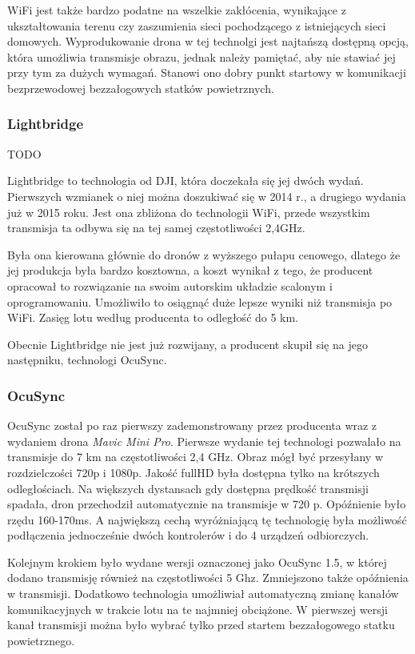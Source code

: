 WiFi jest także bardzo podatne na wszelkie zakłócenia, wynikające z ukształtowania terenu czy zaszumienia sieci pochodzącego z istniejących sieci domowych. Wyprodukowanie drona w tej technolgi jest najtańszą dostępną opcją, która umożliwia transmisje obrazu, jednak należy pamiętać, aby nie stawiać jej przy tym za dużych wymagań. Stanowi ono dobry punkt startowy w komunikacji bezprzewodowej bezzałogowych statków powietrznych.

\subsubsection{Lightbridge} TODO

Lightbridge to technologia od DJI, która doczekała się jej dwóch wydań. Pierwszych wzmianek o niej można doszukiwać się w 2014 r., a drugiego wydania już w 2015 roku. Jest ona zbliżona do technologii WiFi, przede wszystkim transmisja ta odbywa się na tej samej częstotliwości 2,4GHz.


Była ona kierowana głównie do dronów z wyższego pułapu cenowego, dlatego że jej produkcja była bardzo kosztowna, a koszt wynikał z tego, że producent opracował to rozwiązanie na swoim autorskim układzie scalonym i oprogramowaniu. Umożliwiło to osiągnąć duże lepsze wyniki niż transmisja po WiFi. Zasięg lotu według producenta to odległość do 5 km.


Obecnie Lightbridge nie jest już rozwijany, a producent skupił się na jego następniku, technologi OcuSync. \cite{lightbridge-dji}\cite{lightbridge2-dji}

\subsubsection{OcuSync} 
OcuSync został po raz pierwszy zademonstrowany przez producenta wraz z wydaniem drona \emph{Mavic Mini Pro}. Pierwsze wydanie tej technologi pozwalało na transmisje do 7 km na częstotliwości 2,4 GHz. Obraz mógł być przesyłany w rozdzielczości 720p i 1080p. Jakość fullHD była dostępna tylko na krótszych odległościach. Na większych dystansach gdy dostępna prędkość transmisji spadała, dron przechodził automatycznie na transmisje w 720 p. Opóźnienie było rzędu 160-170ms. A największą cechą wyróżniającą tę technologię była możliwość podłączenia jednocześnie dwóch kontrolerów i do 4 urządzeń odbiorczych.

Kolejnym krokiem było wydane wersji oznaczonej jako OcuSync 1.5, w której dodano transmisję również na częstotliwości 5 Ghz. Zmniejszono także opóźnienia w transmisji. Dodatkowo technologia umożliwiał automatyczną zmianę kanałów komunikacyjnych w trakcie lotu na te najmniej obciążone. W pierwszej wersji kanał
transmisji można było wybrać tylko przed startem bezzałogowego statku powietrznego.\cite{ocusync-yt}


